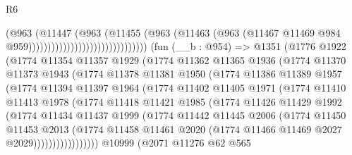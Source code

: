 \begin{lexlean}{R6}
\begin{coremodule}
                                                  (@963
                                                    (@11447
                                                      (@963
                                                        (@11455
                                                          (@963
                                                            (@11463
                                                              (@963
                                                                (@11467
                                                                  @11469
                                                                  @984
                                                                  @959)))))))))))))))))))))))))))))))
    (fun (__b : @954) =>
    @1351
      (@1776
        @1922
        (@1774
          @11354
          @11357
          @1929
          (@1774
            @11362
            @11365
            @1936
            (@1774
              @11370
              @11373
              @1943
              (@1774
                @11378
                @11381
                @1950
                (@1774
                  @11386
                  @11389
                  @1957
                  (@1774
                    @11394
                    @11397
                    @1964
                    (@1774
                      @11402
                      @11405
                      @1971
                      (@1774
                        @11410
                        @11413
                        @1978
                        (@1774
                          @11418
                          @11421
                          @1985
                          (@1774
                            @11426
                            @11429
                            @1992
                            (@1774
                              @11434
                              @11437
                              @1999
                              (@1774
                                @11442
                                @11445
                                @2006
                                (@1774
                                  @11450
                                  @11453
                                  @2013
                                  (@1774
                                    @11458
                                    @11461
                                    @2020
                                    (@1774 @11466 @11469 @2027 @2029)))))))))))))))))
    @10999
    (@2071
      @11276
      @62
      @565

\end{coremodule}
\end{lexlean}
